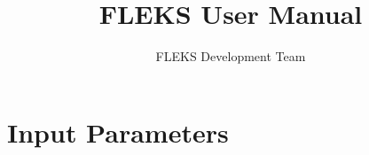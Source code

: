 \documentclass[twoside,10pt]{book}
\title{FLEKS User Manual}
\author{FLEKS Development Team}
\begin{document}
\pagestyle{plain}

\maketitle
\tableofcontents

\chapter{Input Parameters \label{chapter:param}}


\printindex
\end{document}
